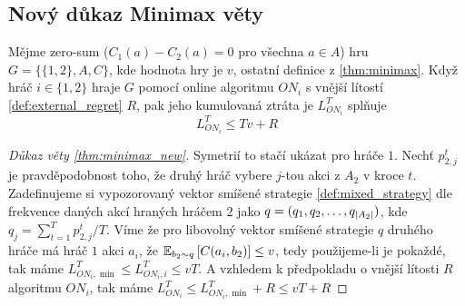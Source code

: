 \subsection{Nový důkaz Minimax věty}
\begin{theorem}
\label{thm:minimax_new}
Mějme zero-sum ($C_1(a) - C_2(a) = 0$ pro všechna $a \in A$) hru $G = \{\{1,2\}, A, C\}$, kde hodnota hry je $v$, ostatní definice z \ref{thm:minimax}. 
Když hráč $i\in \{1,2\}$ hraje $G$ pomocí online algoritmu $ON_i$ s vnější lítostí \ref{def:external_regret} $R$, pak jeho kumulovaná ztráta je $L_{ON_i}^T$ splňuje 
\[
    L_{ON_i}^T \leq Tv + R
\]
\end{theorem}

\begin{proof}[Důkaz věty \ref{thm:minimax_new}]
    Symetrií to stačí ukázat pro hráče $1$. 
    Nechť $p^t_{2,j}$ je pravděpodobnost toho, že druhý hráč vybere $j$-tou akci z $A_2$ v kroce $t$. 
    Zadefinujeme si vypozorovaný vektor smíšené strategie \ref{def:mixed_strategy} dle frekvence daných akcí hraných hráčem $2$ jako $q = (q_1,q_2,\dots,q_{\abs{A_2}})$, kde $q_j = \sum^T_{t=1} p^t_{2,j}/T$. Víme že pro libovolný vektor smíšené strategie $q$ druhého hráče má hráč $1$ akci $a_i$, že $\E[b_2\sim q]{C(a_i, b_2)} \leq v$, tedy použijeme-li je pokaždé, tak máme $L^T_{ON_i,\min} \leq L^T_{ON_i,i} \leq vT$. 
    A vzhledem k předpokladu o vnější lítosti $R$ algoritmu $ON_i$, tak máme $L^T_{ON_i} \leq L^T_{ON_i,\min} + R \leq  vT +R$
\end{proof}


